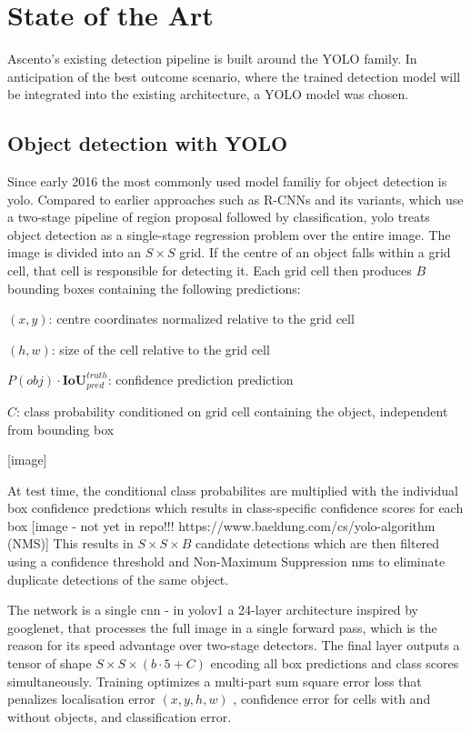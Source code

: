 \chapter{State of the Art}
Ascento's existing detection pipeline is built around the YOLO family. In anticipation of the best outcome scenario, 
where the trained detection model will be integrated into the existing architecture, a YOLO model was chosen. 

\section{Object detection with YOLO}
Since early 2016 the most commonly used model familiy for object detection is \gls{yolo}. 
Compared to earlier approaches such as \gls{R-CNN}s\cite{object-detection} and its variants, which use a two-stage pipeline of region proposal followed by classification, 
\gls{yolo} treats object detection as a single-stage regression problem over the entire image. 
The image is divided into an $S \times S$ grid. If the centre of an object falls within a grid cell, that cell is responsible for detecting it. 
Each grid cell then produces $B$ bounding boxes containing the following predictions:
\begin{listitemize}
\item {$(x,y)$: centre coordinates normalized relative to the grid cell}
\item {$(h,w)$: size of the cell relative to the grid cell}
\item {$P(obj)\cdot \mathbf{IoU}^{truth}_{pred}$}: confidence prediction prediction
\item {$C$: class probability conditioned on grid cell containing the object, independent from bounding box}
\end{listitemize}

[image]

At test time, the conditional class probabilites are multiplied with the individual box confidence predctions which results in class-specific confidence scores for each box
[image - not yet in repo!!! https://www.baeldung.com/cs/yolo-algorithm (NMS)]
This results in $S\times S\times B$ candidate detections which are then filtered using a confidence threshold and Non-Maximum Suppression \gls{nms} 
to eliminate duplicate detections of the same object. 

The network is a single \gls{cnn} - in \gls{yolo}v1 a 24-layer architecture inspired by \gls{googlenet}, that processes the full image in a single forward pass, which is the reason for its speed 
advantage over two-stage detectors. The final layer outputs a tensor of shape $S\times S \times (b \cdot 5 + C)$ encoding all box predictions and class scores simultaneously. 
Training optimizes a multi-part \gls{sum square error loss} that penalizes localisation error $(x, y, h, w)$ , confidence error for cells with and without objects, and classification error. 

